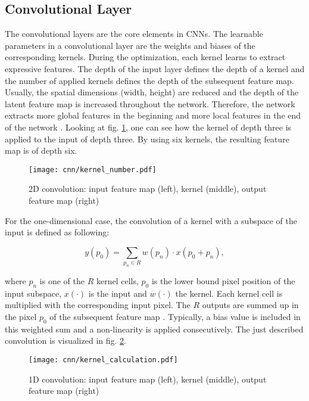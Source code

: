\subsection{Convolutional Layer}
The convolutional layers are the core elements in CNNs. The learnable parameters in a convolutional layer are the weights and biases of the corresponding kernels. During the optimization, each kernel learns to extract expressive features. The depth of the input layer defines the depth of a kernel and the number of applied kernels defines the depth of the subsequent feature map. Usually, the spatial dimensions (width, height) are reduced and the depth of the latent feature map is increased throughout the network. Therefore, the network extracts more global features in the beginning and more local features in the end of the network \cite{OShea2015}. Looking at fig. \ref{fig:kernel_number}, one can see how the kernel of depth three is applied to the input of depth three. By using six kernels, the resulting feature map is of depth six.

\begin{figure}[H]
  \centering
  \texttt{[image: cnn/kernel\_number.pdf]}
  \caption {2D convolution: input feature map (left), kernel (middle), output feature map (right)}
  \label{fig:kernel_number}
\end{figure}

For the one-dimensional case, the convolution of a kernel with a subspace of the input is defined as following:

\begin{equation}
  y(p_{0}) = \sum_{p_{n} \in R} w(p_{n}) \cdot x(p_{0} + p_{n}), 
  \label{eq:kernel}
\end{equation}

where $p_{n}$ is one of the $R$ kernel cells, $p_{0}$ is the lower bound pixel position of the input subspace, $x(\cdot)$ is the input and $w(\cdot)$ the kernel. Each kernel cell is multiplied with the corresponding input pixel. The $R$ outputs are summed up in the pixel $p_{0}$ of the subsequent feature map \cite{Dai2017}. Typically, a bias value is included in this weighted sum and a non-linearity is applied consecutively. The just described convolution is visualized in fig. \ref{fig:kernel}.

\begin{figure}[H]
  \centering
  \texttt{[image: cnn/kernel\_calculation.pdf]}
  \caption {1D convolution: input feature map (left), kernel (middle), output feature map (right)}
  \label{fig:kernel}
\end{figure}

